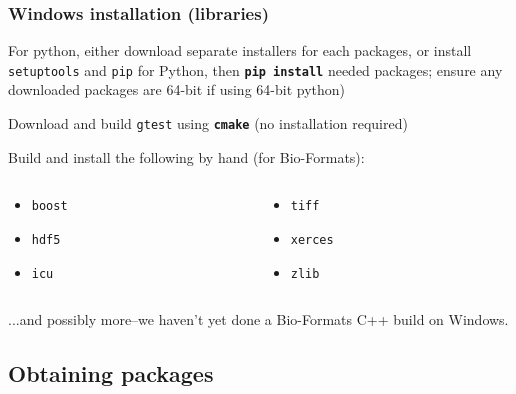 \documentclass{beamer}
\newcommand{\cmd}[1]{\textbf{\texttt{#1}}}
\newcommand{\pkg}[1]{\texttt{#1}}
\begin{document}
\begin{frame}
  \frametitle{Windows installation (libraries)}

For python, either download separate installers for each packages, or
install \pkg{setuptools} and \pkg{pip} for Python, then \cmd{pip
  install} needed packages; ensure any downloaded packages are 64-bit
if using 64-bit python)
\bigskip

Download and build \pkg{gtest} using \cmd{cmake} (no installation
required)
\bigskip

Build and install the following by hand (for Bio-Formats):
  \begin{columns}
    \begin{column}{.5\linewidth}
      \begin{itemize}
      \item[] \pkg{boost}
      \item[] \pkg{hdf5}
      \item[] \pkg{icu}
      \end{itemize}
    \end{column}
    \begin{column}{.5\linewidth}
      \begin{itemize}
      \item[] \pkg{tiff}
      \item[] \pkg{xerces}
      \item[] \pkg{zlib}
      \end{itemize}
    \end{column}
  \end{columns}
...and possibly more--we haven't yet done a Bio-Formats C++ build on Windows.
\end{frame}

\subsection{Obtaining packages}
\end{document}
